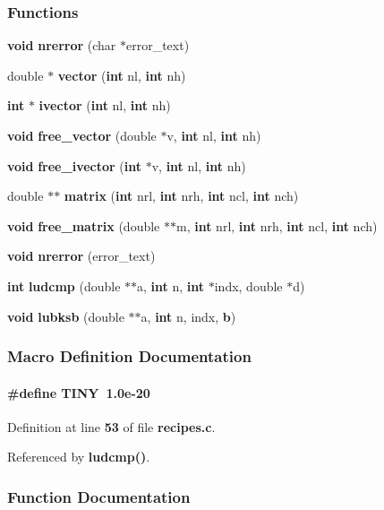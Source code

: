 \subsubsection*{Functions}
\begin{DoxyCompactItemize}
\item 
{\bf void} {\bf nrerror} (char $\ast$error\+\_\+text)
\item 
double $\ast$ {\bf vector} ({\bf int} nl, {\bf int} nh)
\item 
{\bf int} $\ast$ {\bf ivector} ({\bf int} nl, {\bf int} nh)
\item 
{\bf void} {\bf free\+\_\+vector} (double $\ast$v, {\bf int} nl, {\bf int} nh)
\item 
{\bf void} {\bf free\+\_\+ivector} ({\bf int} $\ast$v, {\bf int} nl, {\bf int} nh)
\item 
double $\ast$$\ast$ {\bf matrix} ({\bf int} nrl, {\bf int} nrh, {\bf int} ncl, {\bf int} nch)
\item 
{\bf void} {\bf free\+\_\+matrix} (double $\ast$$\ast$m, {\bf int} nrl, {\bf int} nrh, {\bf int} ncl, {\bf int} nch)
\item 
{\bf void} {\bf nrerror} (error\+\_\+text)
\item 
{\bf int} {\bf ludcmp} (double $\ast$$\ast$a, {\bf int} n, {\bf int} $\ast$indx, double $\ast$d)
\item 
{\bf void} {\bf lubksb} (double $\ast$$\ast$a, {\bf int} n, indx, {\bf b})
\end{DoxyCompactItemize}


\subsubsection{Macro Definition Documentation}
\paragraph[{T\+I\+NY}]{\setlength{\rightskip}{0pt plus 5cm}\#define T\+I\+NY~1.\+0e-\/20}\label{recipes_8c_acf1c38f71f39386356edb151a131ad11}


Definition at line {\bf 53} of file {\bf recipes.\+c}.



Referenced by {\bf ludcmp()}.



\subsubsection{Function Documentation}
